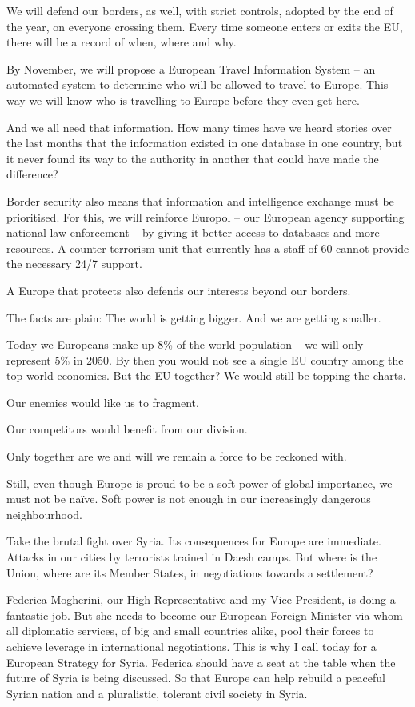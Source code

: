 \documentclass[a4paper,11pt]{article}
\begin{document}
We will defend our borders, as well, with strict controls, adopted by the end of the year, on everyone crossing them. Every time someone enters or exits the EU, there will be a record of when, where and why.

By November, we will propose a European Travel Information System – an automated system to determine who will be allowed to travel to Europe. This way we will know who is travelling to Europe before they even get here.

And we all need that information. How many times have we heard stories over the last months that the information existed in one database in one country, but it never found its way to the authority in another that could have made the difference?

Border security also means that information and intelligence exchange must be prioritised. For this, we will reinforce Europol – our European agency supporting national law enforcement – by giving it better access to databases and more resources. A counter terrorism unit that currently has a staff of 60 cannot provide the necessary 24/7 support.

A Europe that protects also defends our interests beyond our borders.

The facts are plain: The world is getting bigger. And we are getting smaller.

Today we Europeans make up 8\% of the world population – we will only represent 5\% in 2050. By then you would not see a single EU country among the top world economies. But the EU together? We would still be topping the charts.

Our enemies would like us to fragment.

Our competitors would benefit from our division.

Only together are we and will we remain a force to be reckoned with.

Still, even though Europe is proud to be a soft power of global importance, we must not be naïve. Soft power is not enough in our increasingly dangerous neighbourhood.

Take the brutal fight over Syria. Its consequences for Europe are immediate. Attacks in our cities by terrorists trained in Daesh camps. But where is the Union, where are its Member States, in negotiations towards a settlement?

Federica Mogherini, our High Representative and my Vice-President, is doing a fantastic job. But she needs to become our European Foreign Minister via whom all diplomatic services, of big and small countries alike, pool their forces to achieve leverage in international negotiations. This is why I call today for a European Strategy for Syria. Federica should have a seat at the table when the future of Syria is being discussed. So that Europe can help rebuild a peaceful Syrian nation and a pluralistic, tolerant civil society in Syria.
\end{document}
